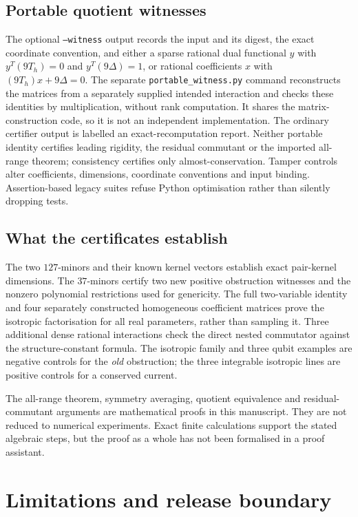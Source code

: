 \documentclass[11pt,a4paper]{article}
\numberwithin{equation}{section}
\theoremstyle{definition}\newtheorem{definition}[theorem]{Definition}
\theoremstyle{remark}\newtheorem{remark}[theorem]{Remark}
\begin{document}
\subsection{Portable quotient witnesses}
The optional \texttt{--witness} output records the input and its digest, the exact coordinate convention, and either a sparse rational dual functional $y$ with $y^T(9T_h)=0$ and $y^T(9\Delta)=1$, or rational coefficients $x$ with $(9T_h)x+9\Delta=0$. The separate \texttt{portable\_witness.py} command reconstructs the matrices from a separately supplied intended interaction and checks these identities by multiplication, without rank computation. It shares the matrix-construction code, so it is not an independent implementation. The ordinary certifier output is labelled an exact-recomputation report. Neither portable identity certifies leading rigidity, the residual commutant or the imported all-range theorem; consistency certifies only almost-conservation. Tamper controls alter coefficients, dimensions, coordinate conventions and input binding. Assertion-based legacy suites refuse Python optimisation rather than silently dropping tests.

\subsection{What the certificates establish}
The two $127$-minors and their known kernel vectors establish exact pair-kernel dimensions. The $37$-minors certify two new positive obstruction witnesses and the nonzero polynomial restrictions used for genericity. The full two-variable identity and four separately constructed homogeneous coefficient matrices prove the isotropic factorisation for all real parameters, rather than sampling it. Three additional dense rational interactions check the direct nested commutator against the structure-constant formula. The isotropic family and three qubit examples are negative controls for the \emph{old} obstruction; the three integrable isotropic lines are positive controls for a conserved current.

The all-range theorem, symmetry averaging, quotient equivalence and residual-commutant arguments are mathematical proofs in this manuscript. They are not reduced to numerical experiments. Exact finite calculations support the stated algebraic steps, but the proof as a whole has not been formalised in a proof assistant.

\section{Limitations and release boundary}\label{sec:limits}
\end{document}
